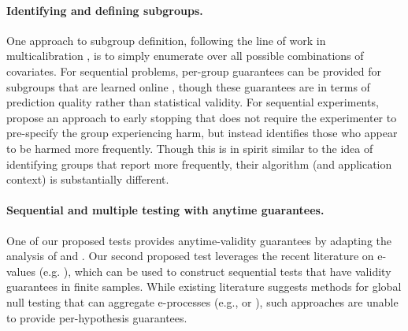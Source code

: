 \paragraph{Identifying and defining subgroups.}
One approach to subgroup definition, following the line of work in multicalibration \cite{hebert2018multicalibration}, is to simply enumerate over all possible combinations of covariates. 
For sequential problems, per-group guarantees can be provided for subgroups that are learned online \citep{dai2024learning}, though these guarantees are in terms of prediction quality rather than statistical validity. For sequential experiments, \citet{adam2024should}  propose an approach to early stopping that does not require the experimenter to pre-specify the group experiencing harm, but instead identifies those who appear to be harmed more frequently. Though this is in spirit similar to the idea of identifying groups that report more frequently, their algorithm (and application context) is substantially different.

\paragraph{Sequential and multiple testing with anytime guarantees.}
One of our proposed tests provides anytime-validity guarantees by adapting the analysis of \cite{jamieson2014lil} and \cite{balsubramani2014sharp}. 
Our second proposed test leverages the recent literature on e-values (e.g. \cite{waudby2024estimating,vovk2021values}), which can be used to construct sequential tests that have validity guarantees in finite samples. While existing literature suggests methods for global null testing that can aggregate e-processes (e.g., \citet{choPeekingPEAKSequential2024} or \citet{chi2022multiple}), such approaches are unable to provide per-hypothesis guarantees. 


